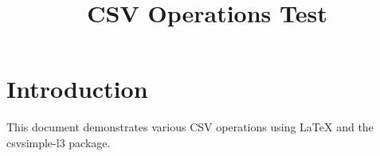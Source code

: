 \documentclass[12pt]{article}
\title{CSV Operations Test}
\author{}
\date{}
\begin{document}
\maketitle

\section{Introduction}
This document demonstrates various CSV operations using LaTeX and the
csvsimple-l3 package.

\begin{table}[htbp]
    \caption{Comparison of different methods on various metrics. Arrows indicate whether higher ($\uparrow$) or lower ($\downarrow$) is better.}
    \label{tb:arrowheader}
\end{table}
\end{document}
